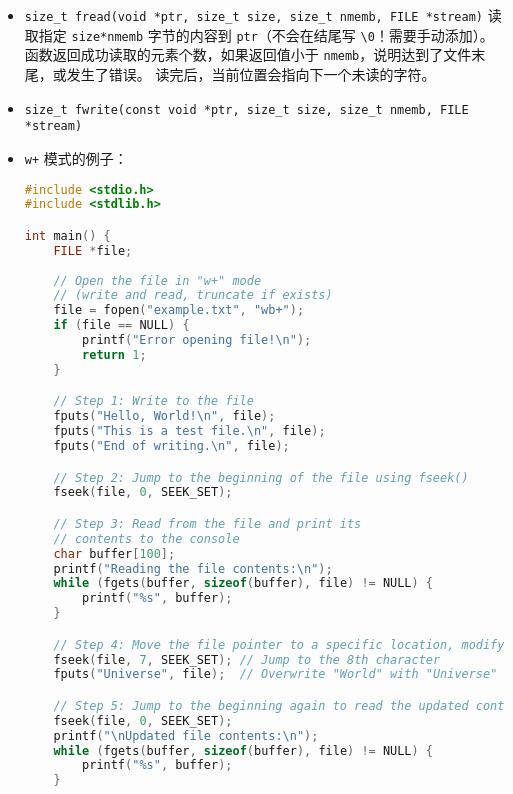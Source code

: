 \begin{itemize}
\begin{lstlisting}[language=cpp]
    // Print the string
    printf("Read string: %s\n", buffer);

    // Free the allocated memory and close the file
    free(buffer);
    fclose(file);

    return 0;
}
\end{lstlisting}
\item \verb`size_t fread(void *ptr, size_t size, size_t nmemb, FILE *stream)` 读取指定 \verb`size*nmemb` 字节的内容到 \verb`ptr`（不会在结尾写 \verb`\0`！需要手动添加）。 函数返回成功读取的元素个数，如果返回值小于 \verb`nmemb`，说明达到了文件末尾，或发生了错误。 读完后，当前位置会指向下一个未读的字符。
\item \verb`size_t fwrite(const void *ptr, size_t size, size_t nmemb, FILE *stream)`
\item \verb`w+` 模式的例子：
\begin{lstlisting}[language=cpp]
#include <stdio.h>
#include <stdlib.h>

int main() {
    FILE *file;
    
    // Open the file in "w+" mode
    // (write and read, truncate if exists)
    file = fopen("example.txt", "wb+");
    if (file == NULL) {
        printf("Error opening file!\n");
        return 1;
    }

    // Step 1: Write to the file
    fputs("Hello, World!\n", file);
    fputs("This is a test file.\n", file);
    fputs("End of writing.\n", file);

    // Step 2: Jump to the beginning of the file using fseek()
    fseek(file, 0, SEEK_SET);

    // Step 3: Read from the file and print its
    // contents to the console
    char buffer[100];
    printf("Reading the file contents:\n");
    while (fgets(buffer, sizeof(buffer), file) != NULL) {
        printf("%s", buffer);
    }

    // Step 4: Move the file pointer to a specific location, modify contents
    fseek(file, 7, SEEK_SET); // Jump to the 8th character
    fputs("Universe", file);  // Overwrite "World" with "Universe"

    // Step 5: Jump to the beginning again to read the updated content
    fseek(file, 0, SEEK_SET);
    printf("\nUpdated file contents:\n");
    while (fgets(buffer, sizeof(buffer), file) != NULL) {
        printf("%s", buffer);
    }


\end{lstlisting}
\end{itemize}
